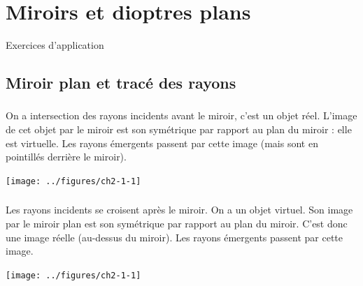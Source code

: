\documentclass[../main/main.tex]{subfiles}
\begin{document}
\setcounter{chapter}{1}
\chapter{Miroirs et dioptres plans}
\vspace*{-47pt}
\begin{center}
    \Huge Exercices d'application
\end{center}

\section{Miroir plan et tracé des rayons}
\subsection{}
\begin{minipage}{0.75\linewidth}
    On a intersection des rayons incidents avant le miroir, c'est un objet réel.
    L'image de cet objet par le miroir est son symétrique par rapport au plan du
    miroir : elle est virtuelle. Les rayons émergents passent par cette image
    (mais sont en pointillés derrière le miroir).
\end{minipage}
\begin{minipage}[c]{0.25\linewidth}
    \begin{flushright}
        \texttt{[image: ../figures/ch2-1-1]}
    \end{flushright}
\end{minipage}

\subsection{}
\begin{minipage}{0.75\linewidth}
    Les rayons incidents se croisent après le miroir. On a un objet virtuel. Son
    image par le miroir plan est son symétrique par rapport au plan du miroir.
    C'est donc une image réelle (au-dessus du miroir). Les rayons émergents
    passent par cette image.
\end{minipage}
\begin{minipage}{0.25\linewidth}
    \begin{flushright}
        \texttt{[image: ../figures/ch2-1-1]}
    \end{flushright}
\end{minipage}
\end{document}
